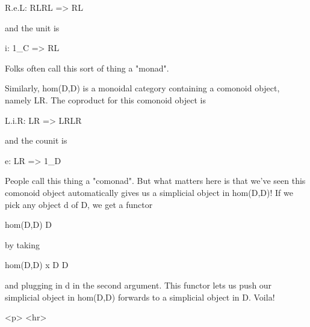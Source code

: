 R.e.L: RLRL => RL

and the unit is

i: 1_{C} => RL

Folks often call this sort of thing a "monad".  

Similarly, hom(D,D) is a monoidal category containing a comonoid object,
namely LR.  The coproduct for this comonoid object is

L.i.R: LR => LRLR

and the counit is

e: LR => 1_{D}

People call this thing a "comonad".  But what matters here is that we've
seen this comonoid object automatically gives us a simplicial object in
hom(D,D)!  If we pick any object d of D, we get a functor

hom(D,D) \to  D

by taking 

hom(D,D) x D \to  D

and plugging in d in the second argument.  This functor lets us push our
simplicial object in hom(D,D) forwards to a simplicial object in D.
Voila!












<p> <hr>



